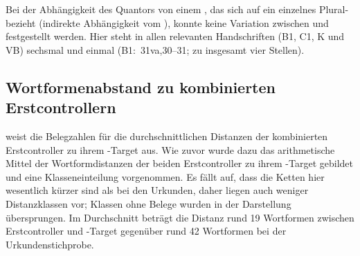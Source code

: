 Bei der Abhängigkeit des Quantors von einem , das sich
auf ein einzelnes Plural- bezieht (indirekte Abhängigkeit vom
), konnte keine Variation zwischen  und 
festgestellt werden. Hier steht in allen relevanten Handschriften (B1, C1, K
und VB) sechsmal  und einmal  (B1:~31va,30--31; zu
insgesamt vier Stellen).


\subsection{Wortformenabstand zu kombinierten Erstcontrollern}

 weist die Belegzahlen für die durchschnittlichen
Distanzen der kombinierten Erstcontroller zu ihrem -Target aus. Wie
zuvor wurde dazu das arithmetische Mittel der Wortformdistanzen der beiden
Erstcontroller zu ihrem -Target gebildet und eine
Klasseneinteilung vorgenommen. Es fällt auf, dass die
Ketten hier wesentlich kürzer sind als bei den
Urkunden, daher liegen auch weniger Distanzklassen vor; Klassen
ohne Belege wurden in der Darstellung übersprungen. Im Durchschnitt beträgt die
Distanz rund 19 Wortformen zwischen Erstcontroller und -Target
gegenüber rund 42 Wortformen bei der Urkundenstichprobe.

